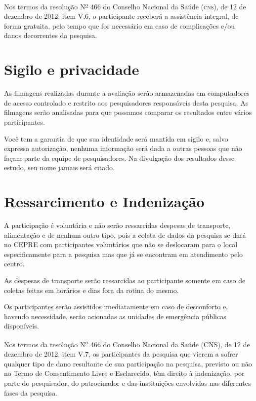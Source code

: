 \documentclass[a4paper,11pt,titlepage,singlespacing]{article}
\begin{document}
Nos termos da resolução N\textsuperscript{\underline{o}} 466 do Conselho Nacional da Saúde (\textsc{cns}), de 12 de dezembro de 2012, item V.6, o participante receberá a assistência integral, de forma gratuita, pelo tempo que for necessário em caso de complicações e/ou danos decorrentes da pesquisa.


\section*{Sigilo e privacidade}

As filmagens realizadas durante a avaliação serão armazenadas em computadores de acesso controlado e restrito aos pesquisadores responsáveis desta pesquisa. As filmagens serão analisadas para que possamos comparar os resultados entre vários participantes.

Você tem a garantia de que sua identidade será mantida em sigilo e, salvo expressa autorização, nenhuma informação será dada a outras pessoas que não façam parte da equipe de pesquisadores. Na divulgação dos resultados desse estudo, seu nome jamais será citado.


\section*{Ressarcimento e Indenização}

A participação é voluntária e não serão ressarcidas despesas de transporte, alimentação e de nenhum outro tipo, pois a coleta de dados da pesquisa se dará no CEPRE com participantes voluntários que não se deslocaram para o local especificamente para a pesquisa mas que já se encontram em atendimento pelo centro.

As despesas de transporte serão ressarcidas ao participante somente em caso de coletas feitas em horários e dias fora da rotina do mesmo.

Os participantes serão assistidos imediatamente em caso de desconforto e, havendo necessidade, serão acionadas as unidades de emergência públicas disponíveis. 

Nos termos da resolução N\textsuperscript{\underline{o}} 466 do Conselho Nacional da Saúde (CNS), de 12 de dezembro de 2012, item V.7, os participantes da pesquisa que vierem a sofrer qualquer tipo de dano resultante de sua participação na pesquisa, previsto ou não no Termo de Consentimento Livre e Esclarecido, têm direito à indenização, por parte do pesquisador, do patrocinador e das instituições envolvidas nas diferentes fases da pesquisa.
\end{document}
